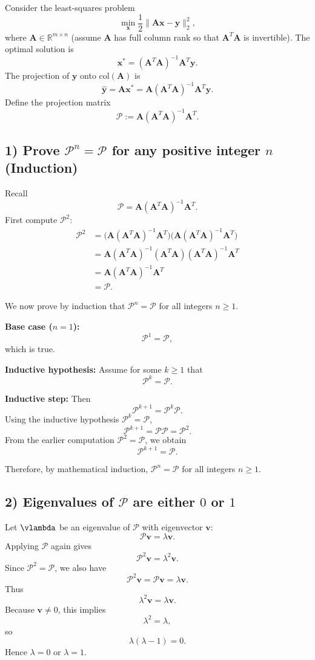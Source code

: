 \documentclass[11pt]{article}
\newcommand{\mtx}[1]{\mathbf{#1}}
\newcommand{\vct}[1]{\mathbf{#1}}
\def \mA {\mtx{A}}
\def \vv {\vct{v}}
\def \vx {\vct{x}}
\def \vy {\vct{y}}
\begin{document}
Consider the least-squares problem
\[
\min_{\vx}\frac12\|\mA\vx-\vy\|_2^2,
\]
where $\mA\in\mathbb{R}^{m\times n}$ (assume $\mA$ has full column rank so that $\mA^T\mA$ is invertible).
The optimal solution is
\[
\vx^*=(\mA^T\mA)^{-1}\mA^T\vy.
\]
The projection of $\vy$ onto $\mathrm{col}(\mA)$ is
\[
\hat{\vy}=\mA\vx^*=\mA(\mA^T\mA)^{-1}\mA^T\vy.
\]
Define the projection matrix
\[
\mathcal{P} := \mA(\mA^T\mA)^{-1}\mA^T.
\]

\subsection*{1) Prove $\mathcal{P}^n=\mathcal{P}$ for any positive integer $n$ (Induction)}

Recall
\[
\mathcal{P}=\mA(\mA^T\mA)^{-1}\mA^T.
\]
First compute $\mathcal{P}^2$:
\begin{align*}
\mathcal{P}^2
&=\Big(\mA(\mA^T\mA)^{-1}\mA^T\Big)\Big(\mA(\mA^T\mA)^{-1}\mA^T\Big)\\
&=\mA(\mA^T\mA)^{-1}(\mA^T\mA)(\mA^T\mA)^{-1}\mA^T\\
&=\mA(\mA^T\mA)^{-1}\mA^T\\
&=\mathcal{P}.
\end{align*}

We now prove by induction that $\mathcal{P}^n=\mathcal{P}$ for all integers $n\ge 1$.

\textbf{Base case ($n=1$):}
\[
\mathcal{P}^1=\mathcal{P},
\]
which is true.

\textbf{Inductive hypothesis:} Assume for some $k\ge 1$ that
\[
\mathcal{P}^k=\mathcal{P}.
\]

\textbf{Inductive step:} Then
\[
\mathcal{P}^{k+1}=\mathcal{P}^k\mathcal{P}.
\]
Using the inductive hypothesis $\mathcal{P}^k=\mathcal{P}$,
\[
\mathcal{P}^{k+1}=\mathcal{P}\mathcal{P}=\mathcal{P}^2.
\]
From the earlier computation $\mathcal{P}^2=\mathcal{P}$, we obtain
\[
\mathcal{P}^{k+1}=\mathcal{P}.
\]

Therefore, by mathematical induction, $\mathcal{P}^n=\mathcal{P}$ for all integers $n\ge 1$.

\subsection*{2) Eigenvalues of $\mathcal{P}$ are either $0$ or $1$}

Let $\vlambda$ be an eigenvalue of $\mathcal P$ with eigenvector $\vv$:
\[
\mathcal P\vv=\lambda\vv.
\]
Applying $\mathcal P$ again gives
\[
\mathcal P^2\vv=\lambda^2\vv.
\]
Since $\mathcal P^2=\mathcal P$, we also have
\[
\mathcal P^2\vv=\mathcal P\vv=\lambda\vv.
\]
Thus
\[
\lambda^2\vv=\lambda\vv.
\]
Because $\vv\neq0$, this implies
\[
\lambda^2=\lambda,
\]
so
\[
\lambda(\lambda-1)=0.
\]
Hence $\lambda=0$ or $\lambda=1$.
\end{document}
